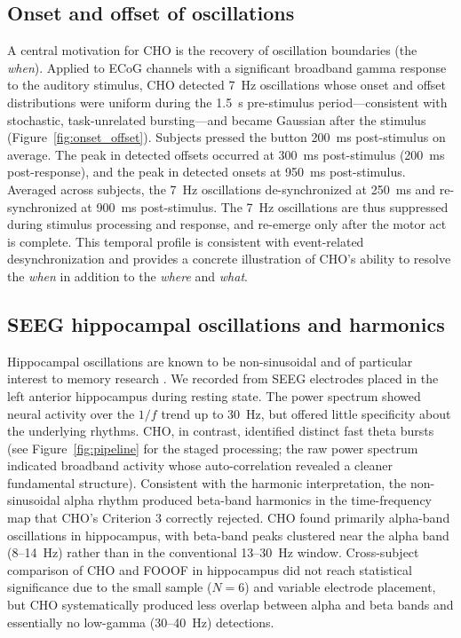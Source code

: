 \documentclass[11pt]{article}
\begin{document}
\subsection{Onset and offset of oscillations}

A central motivation for CHO is the recovery of oscillation boundaries (the \emph{when}). Applied to ECoG channels with a significant broadband gamma response to the auditory stimulus, CHO detected 7~Hz oscillations whose onset and offset distributions were uniform during the 1.5~s pre-stimulus period---consistent with stochastic, task-unrelated bursting---and became Gaussian after the stimulus (Figure~\ref{fig:onset_offset}). Subjects pressed the button 200~ms post-stimulus on average. The peak in detected offsets occurred at 300~ms post-stimulus (200~ms post-response), and the peak in detected onsets at 950~ms post-stimulus. Averaged across subjects, the 7~Hz oscillations de-synchronized at 250~ms and re-synchronized at 900~ms post-stimulus. The 7~Hz oscillations are thus suppressed during stimulus processing and response, and re-emerge only after the motor act is complete. This temporal profile is consistent with event-related desynchronization \citep{pfurtscheller1999eventrelated} and provides a concrete illustration of CHO's ability to resolve the \emph{when} in addition to the \emph{where} and \emph{what}.

\subsection{SEEG hippocampal oscillations and harmonics}

Hippocampal oscillations are known to be non-sinusoidal and of particular interest to memory research \citep{belluscio2012crossfrequency}. We recorded from SEEG electrodes placed in the left anterior hippocampus during resting state. The power spectrum showed neural activity over the $1/f$ trend up to 30~Hz, but offered little specificity about the underlying rhythms. CHO, in contrast, identified distinct fast theta bursts (see Figure~\ref{fig:pipeline} for the staged processing; the raw power spectrum indicated broadband activity whose auto-correlation revealed a cleaner fundamental structure). Consistent with the harmonic interpretation, the non-sinusoidal alpha rhythm produced beta-band harmonics in the time-frequency map that CHO's Criterion 3 correctly rejected. CHO found primarily alpha-band oscillations in hippocampus, with beta-band peaks clustered near the alpha band (8--14~Hz) rather than in the conventional 13--30~Hz window. Cross-subject comparison of CHO and FOOOF in hippocampus did not reach statistical significance due to the small sample ($N=6$) and variable electrode placement, but CHO systematically produced less overlap between alpha and beta bands and essentially no low-gamma (30--40~Hz) detections.
\end{document}
